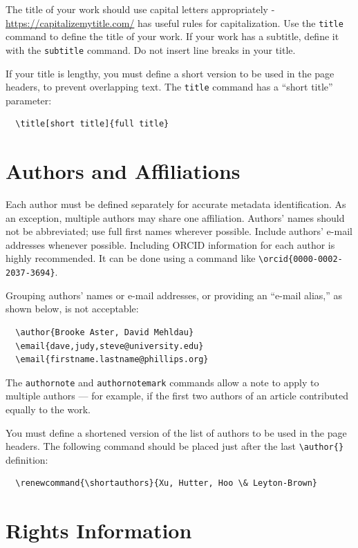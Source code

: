 \documentclass[]{jair}
\begin{document}
The title of your work should use capital letters appropriately -
\url{https://capitalizemytitle.com/} has useful rules for
capitalization. Use the {\verb|title|} command to define the title of
your work. If your work has a subtitle, define it with the
{\verb|subtitle|} command.  Do not insert line breaks in your title.

If your title is lengthy, you must define a short version to be used
in the page headers, to prevent overlapping text. The \verb|title|
command has a ``short title'' parameter:
\begin{verbatim}
  \title[short title]{full title}
\end{verbatim}

\section{Authors and Affiliations}

Each author must be defined separately for accurate metadata
identification.  As an exception, multiple authors may share one
affiliation. Authors' names should not be abbreviated; use full first
names wherever possible. Include authors' e-mail addresses whenever
possible. Including ORCID information for each author is highly recommended. It can be done using a command like \verb|\orcid{0000-0002-2037-3694}|.

Grouping authors' names or e-mail addresses, or providing an ``e-mail
alias,'' as shown below, is not acceptable:
\begin{verbatim}
  \author{Brooke Aster, David Mehldau}
  \email{dave,judy,steve@university.edu}
  \email{firstname.lastname@phillips.org}
\end{verbatim}

The \verb|authornote| and \verb|authornotemark| commands allow a note
to apply to multiple authors --- for example, if the first two authors
of an article contributed equally to the work.

You must define a shortened version of
the list of authors to be used in the page headers. The following command should be placed just after
the last \verb|\author{}| definition:
\begin{verbatim}
  \renewcommand{\shortauthors}{Xu, Hutter, Hoo \& Leyton-Brown}
\end{verbatim}

\section{Rights Information}
\end{document}
